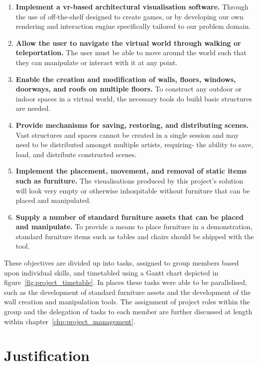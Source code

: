     \begin{enumerate}
        \item{\textbf{Implement a \acrshort{vr}-based architectural visualisation software.}} Through the use of off-the-shelf  designed to create games, or by developing our own rendering and interaction engine specifically tailored to our problem domain.
        \item{\textbf{Allow the user to navigate the virtual world through walking or teleportation.}} The user must be able to move around the world such that they can manipulate or interact with it at any point.
        \item{\textbf{Enable the creation and modification of walls, floors, windows, doorways, and roofs on multiple floors.}} To construct any outdoor or indoor spaces in a virtual world, the necessary tools do build basic structures are needed.
        \item{\textbf{Provide mechanisms for saving, restoring, and distributing scenes.}} Vast structures and spaces cannot be created in a single session and may need to be distributed amongst multiple artists, requiring- the ability to save, load, and distribute constructed scenes.
        \item{\textbf{Implement the placement, movement, and removal of static items such as furniture.}} The visualisations produced by this project's solution will look very empty or otherwise inhospitable without furniture that can be placed and manipulated.
        \item{\textbf{Supply a number of standard furniture assets that can be placed and manipulate.}} To provide a means to place furniture in a demonstration, standard furniture items such as tables and chairs should be shipped with the tool.
    \end{enumerate}
    
    These objectives are divided up into tasks, assigned to group members based upon individual skills, and timetabled using a Gantt chart depicted in figure~\ref{fig:project_timetable}. In places these tasks were able to be parallelised, such as the development of standard furniture assets and the development of the wall creation and manipulation tools. The assignment of project roles within the group and the delegation of tasks to each member are further discussed at length within chapter~\ref{chp:project_management}.

\section{Justification}

